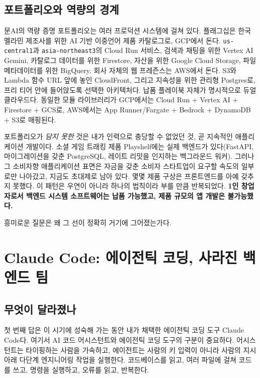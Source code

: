 \documentclass{article}
\begin{document}
\subsection{포트폴리오와 역량의 경계}

문AI의 역량 증명 포트폴리오는 여러 프로덕션 시스템에 걸쳐 있다. 플래그십은 한국 멜라민 제조사를 위한 AI 기반 이중언어 제품 카탈로그로, GCP에서 돈다. \texttt{us-central1}과 \texttt{asia-northeast3}의 Cloud Run 서비스, 검색과 채팅을 위한 Vertex AI Gemini, 카탈로그 데이터를 위한 Firestore, 자산을 위한 Google Cloud Storage, 파일 메타데이터를 위한 BigQuery. 회사 자체의 웹 프레즌스는 AWS에서 돈다. S3와 Lambda 함수 URL 앞에 놓인 CloudFront, 그리고 지속성을 위한 관리형 Postgres로, 프리 티어 안에 들어앉도록 선택한 아키텍처다. 납품 플레이북 자체가 명시적으로 듀얼 클라우드다. 동일한 모듈 라이브러리가 GCP에서는 Cloud Run + Vertex AI + Firestore + GCS로, AWS에서는 App Runner/Fargate + Bedrock + DynamoDB + S3로 매핑된다.

포트폴리오가 \emph{담지 못한} 것은 내가 인력으로 충당할 수 없었던 것, 곧 지속적인 애플리케이션 개발이다. 소셜 게임 트래킹 제품 Playshelf에는 실제 백엔드가 있다(FastAPI, 마이그레이션을 갖춘 PostgreSQL, 레이트 리밋을 인지하는 백그라운드 워커). 그러나 그 소비자향 애플리케이션 표면은 자금을 갖춘 소비자 스타트업이 요구할 속도의 일부로만 나아갔고, 지금도 초대제로 남아 있다. 몇몇 제품 구상은 프론트엔드를 아예 갖추지 못했다. 이 패턴은 우연이 아니라 하나의 법칙이라 부를 만큼 반복되었다. \textbf{1인 창업자로서 백엔드 시스템 소프트웨어는 납품 가능했고, 제품 규모의 앱 개발은 불가능했다.}

흥미로운 질문은 왜 그 선이 정확히 거기에 그어졌는가다.

\section{Claude Code: 에이전틱 코딩, 사라진 백엔드 팀}

\subsection{무엇이 달라졌나}

첫 번째 답은 이 시기에 성숙해 가는 동안 내가 채택한 에이전틱 코딩 도구 Claude Code다. 여기서 AI 코드 어시스턴트와 에이전틱 코딩 도구의 구분이 중요하다. 어시스턴트는 타이핑하는 사람을 가속하고, 에이전트는 사람의 키 입력이 아니라 사람의 지시 아래 다단계 엔지니어링 작업을 실행한다. 코드베이스를 읽고, 여러 파일에 걸쳐 코드를 쓰고, 명령을 실행하고, 오류를 읽고, 반복한다.
\end{document}
